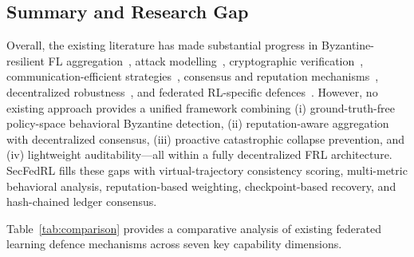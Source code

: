\documentclass[12pt,a4paper]{article}
\begin{document}
\subsection{Summary and Research Gap}

Overall, the existing literature has made substantial progress in Byzantine-resilient
FL aggregation~\cite{ref19,ref20,ref21,ref22,ref27}, attack
modelling~\cite{ref5,ref8,ref16,ref23}, cryptographic
verification~\cite{ref4,ref26}, communication-efficient
strategies~\cite{ref9,ref10,ref11,ref12,ref13}, consensus and reputation
mechanisms~\cite{ref6,ref7,ref14,ref18}, decentralized
robustness~\cite{ref1,ref28,ref29}, and federated RL-specific
defences~\cite{ref15,ref17,ref30}. However, no existing approach provides a unified
framework combining (i) ground-truth-free policy-space behavioral Byzantine detection,
(ii) reputation-aware aggregation with decentralized consensus, (iii) proactive
catastrophic collapse prevention, and (iv) lightweight auditability---all within a
fully decentralized FRL architecture. SecFedRL fills these gaps with virtual-trajectory
consistency scoring, multi-metric behavioral analysis, reputation-based weighting,
checkpoint-based recovery, and hash-chained ledger consensus.

Table~\ref{tab:comparison} provides a comparative analysis of existing federated
learning defence mechanisms across seven key capability dimensions.
\end{document}

